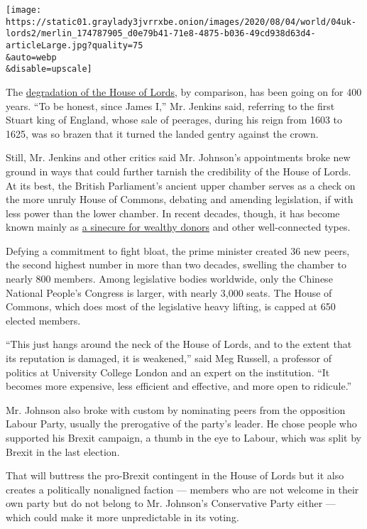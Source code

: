 \texttt{[image: https://static01.graylady3jvrrxbe.onion/images/2020/08/04/world/04uk-lords2/merlin\_174787905\_d0e79b41-71e8-4875-b036-49cd938d63d4-articleLarge.jpg?quality=75\\\&auto=webp\\\&disable=upscale]}

The
\href{https://www.nytimes3xbfgragh.onion/2015/08/23/world/europe/a-british-house-overflowing-with-lords-draws-scorn.html}{degradation
of the House of Lords}, by comparison, has been going on for 400 years.
``To be honest, since James I,'' Mr. Jenkins said, referring to the
first Stuart king of England, whose sale of peerages, during his reign
from 1603 to 1625, was so brazen that it turned the landed gentry
against the crown.

Still, Mr. Jenkins and other critics said Mr. Johnson's appointments
broke new ground in ways that could further tarnish the credibility of
the House of Lords. At its best, the British Parliament's ancient upper
chamber serves as a check on the more unruly House of Commons, debating
and amending legislation, if with less power than the lower chamber. In
recent decades, though, it has become known mainly as
\href{https://www.nytimes3xbfgragh.onion/2009/01/29/world/europe/29iht-lords.1.19775638.html}{a
sinecure for wealthy donors} and other well-connected types.

Defying a commitment to fight bloat, the prime minister created 36 new
peers, the second highest number in more than two decades, swelling the
chamber to nearly 800 members. Among legislative bodies worldwide, only
the Chinese National People's Congress is larger, with nearly 3,000
seats. The House of Commons, which does most of the legislative heavy
lifting, is capped at 650 elected members.

``This just hangs around the neck of the House of Lords, and to the
extent that its reputation is damaged, it is weakened,'' said Meg
Russell, a professor of politics at University College London and an
expert on the institution. ``It becomes more expensive, less efficient
and effective, and more open to ridicule.''

Mr. Johnson also broke with custom by nominating peers from the
opposition Labour Party, usually the prerogative of the party's leader.
He chose people who supported his Brexit campaign, a thumb in the eye to
Labour, which was split by Brexit in the last election.

That will buttress the pro-Brexit contingent in the House of Lords but
it also creates a politically nonaligned faction --- members who are not
welcome in their own party but do not belong to Mr. Johnson's
Conservative Party either --- which could make it more unpredictable in
its voting.

